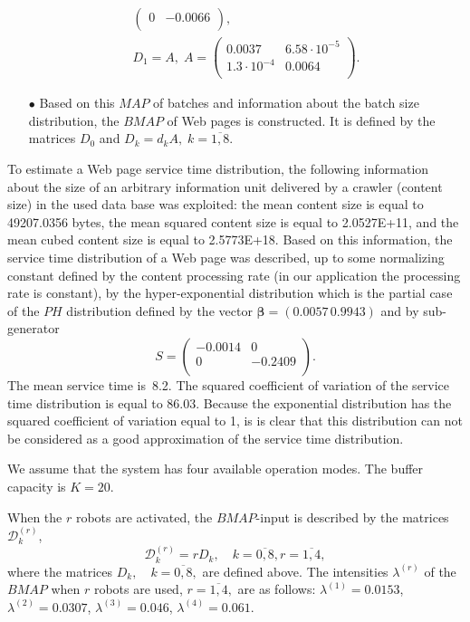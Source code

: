 \documentclass[11pt]{article}
\begin{document}
\begin{itemize}
\begin{gather*}
\begin{pmatrix}
  0 & -0.0066 \\
\end{pmatrix},\;  \\  D_1=A,\;A=\begin{pmatrix}
  0.0037 & 6.58\cdot 10^{-5} \\
  1.3\cdot 10^{-4} & 0.0064 \\
\end{pmatrix}.
\end{gather*}
\item[$\bullet$]
Based on this $MAP$ of batches and information about the batch size
distribution, the $BMAP$ of Web pages is constructed. It is defined
by the matrices $D_0$ and $D_k=d_k A,\; k=\overline{1,8}.$
\end{itemize}

To estimate a Web page service time distribution, the following
information  about the size of an arbitrary information unit
delivered by a crawler (content size) in the used data base was
exploited: the mean content size is equal to 49207.0356 bytes, the
mean squared content size is equal to 2.0527E+11, and the mean cubed
content size is equal to   2.5773E+18. Based on this information,
the service time distribution of a Web page was described, up to
some normalizing constant defined by the content processing rate
(in our application the processing rate is constant), 
by the hyper-exponential distribution which is the partial case of the
$PH$ distribution defined by the vector $ {\boldsymbol \beta} =
(0.0057 \, 0.9943)$ and by sub-generator
$$S=\begin{pmatrix}
  -0.0014  & 0 \\
  0 & -0.2409 \\
\end{pmatrix}.$$ The mean service
time is~8.2. The squared coefficient of variation of the service
time distribution is equal to 86.03. Because the exponential
distribution has the squared coefficient of variation equal to 1, is
is clear that this distribution can not be considered as a good
approximation of the service time distribution.

We assume that the system has four available operation modes. The
buffer capacity is $K=20$.

When the $r$ robots are activated, the $BMAP$-input is described by
the matrices ${\mathcal D}_k^{(r)}$,
$${\mathcal D}_k^{(r)}=rD_k,\quad k=\overline{0,8},r=\overline{1,4},$$
where the matrices $D_k,\quad k=\overline{0,8},$ are defined above.
The intensities $\lambda^{(r)}$ of the $BMAP$ when $r$ robots are
used, $r=\overline{1,4},$ are as follows: $\lambda^{(1)}=0.0153$,
$\lambda^{(2)}=0.0307$, $\lambda^{(3)}=0.046$,
$\lambda^{(4)}=0.061$.
\end{document}
